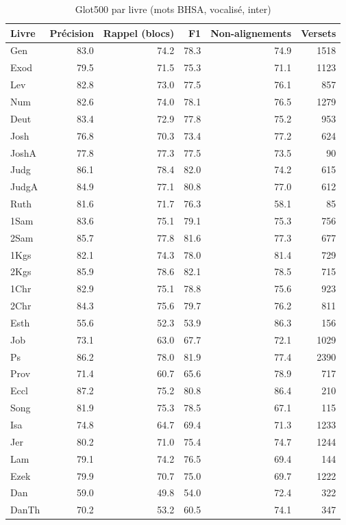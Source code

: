 \begin{table}[ht]
\centering
\caption{Glot500 par livre (mots BHSA, vocalisé, inter)}
\label{tab:glot500_par_livre_mots_bhsa_vocalise_inter}
\begin{tabular}{lrrrrr}
\toprule
Livre & Précision & Rappel (blocs) & F1 & Non-alignements & Versets \\
\midrule
Gen & 83.0 & 74.2 & 78.3 & 74.9 & 1518 \\
Exod & 79.5 & 71.5 & 75.3 & 71.1 & 1123 \\
Lev & 82.8 & 73.0 & 77.5 & 76.1 & 857 \\
Num & 82.6 & 74.0 & 78.1 & 76.5 & 1279 \\
Deut & 83.4 & 72.9 & 77.8 & 75.2 & 953 \\
Josh & 76.8 & 70.3 & 73.4 & 77.2 & 624 \\
JoshA & 77.8 & 77.3 & 77.5 & 73.5 & 90 \\
Judg & 86.1 & 78.4 & 82.0 & 74.2 & 615 \\
JudgA & 84.9 & 77.1 & 80.8 & 77.0 & 612 \\
Ruth & 81.6 & 71.7 & 76.3 & 58.1 & 85 \\
1Sam & 83.6 & 75.1 & 79.1 & 75.3 & 756 \\
2Sam & 85.7 & 77.8 & 81.6 & 77.3 & 677 \\
1Kgs & 82.1 & 74.3 & 78.0 & 81.4 & 729 \\
2Kgs & 85.9 & 78.6 & 82.1 & 78.5 & 715 \\
1Chr & 82.9 & 75.1 & 78.8 & 75.6 & 923 \\
2Chr & 84.3 & 75.6 & 79.7 & 76.2 & 811 \\
Esth & 55.6 & 52.3 & 53.9 & 86.3 & 156 \\
Job & 73.1 & 63.0 & 67.7 & 72.1 & 1029 \\
Ps & 86.2 & 78.0 & 81.9 & 77.4 & 2390 \\
Prov & 71.4 & 60.7 & 65.6 & 78.9 & 717 \\
Eccl & 87.2 & 75.2 & 80.8 & 86.4 & 210 \\
Song & 81.9 & 75.3 & 78.5 & 67.1 & 115 \\
Isa & 74.8 & 64.7 & 69.4 & 71.3 & 1233 \\
Jer & 80.2 & 71.0 & 75.4 & 74.7 & 1244 \\
Lam & 79.1 & 74.2 & 76.5 & 69.4 & 144 \\
Ezek & 79.9 & 70.7 & 75.0 & 69.7 & 1222 \\
Dan & 59.0 & 49.8 & 54.0 & 72.4 & 322 \\
DanTh & 70.2 & 53.2 & 60.5 & 74.1 & 347 \\

\end{tabular}
\end{table}
